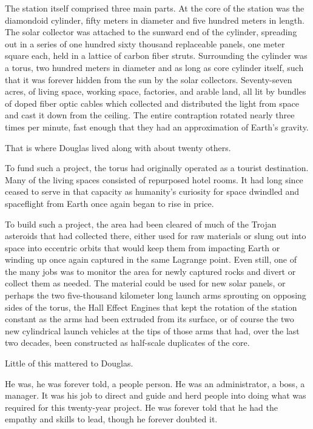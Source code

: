 The station itself comprised three main parts. At the core of the station was the diamondoid cylinder, fifty meters in diameter and five hundred meters in length. The solar collector was attached to the sunward end of the cylinder, spreading out in a series of one hundred sixty thousand replaceable panels, one meter square each, held in a lattice of carbon fiber struts. Surrounding the cylinder was a torus, two hundred meters in diameter and as long as core cylinder itself, such that it was forever hidden from the sun by the solar collectors. Seventy-seven acres, of living space, working space, factories, and arable land, all lit by bundles of doped fiber optic cables which collected and distributed the light from space and cast it down from the ceiling. The entire contraption rotated nearly three times per minute, fast enough that they had an approximation of Earth's gravity.

That is where Douglas lived along with about twenty others.

To fund such a project, the torus had originally operated as a tourist destination. Many of the living spaces consisted of repurposed hotel rooms. It had long since ceased to serve in that capacity as humanity's curiosity for space dwindled and spaceflight from Earth once again began to rise in price.

To build such a project, the area had been cleared of much of the Trojan asteroids that had collected there, either used for raw materials or slung out into space into eccentric orbits that would keep them from impacting Earth or winding up once again captured in the same Lagrange point. Even still, one of the many jobs was to monitor the area for newly captured rocks and divert or collect them as needed. The material could be used for new solar panels, or perhaps the two five-thousand kilometer long launch arms sprouting on opposing sides of the torus, the Hall Effect Engines that kept the rotation of the station constant as the arms had been extruded from its surface, or of course the two new cylindrical launch vehicles at the tips of those arms that had, over the last two decades, been constructed as half-scale duplicates of the core.

Little of this mattered to Douglas.

He was, he was forever told, a people person. He was an administrator, a boss, a manager. It was his job to direct and guide and herd people into doing what was required for this twenty-year project. He was forever told that he had the empathy and skills to lead, though he forever doubted it.

